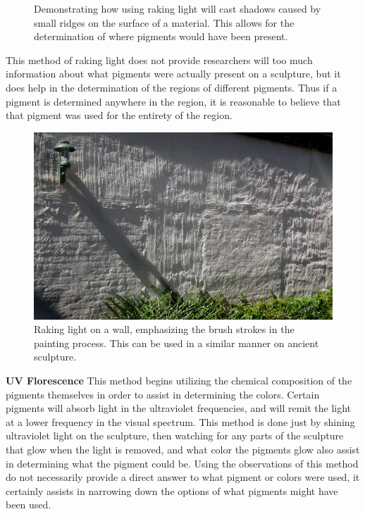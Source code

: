 \documentclass[10pt]{armath}
\begin{document}
\begin{figure}[htpb]
  \begin{center}
  \end{center}
  \caption{Demonstrating how using raking light will cast shadows caused by small
    ridges on the surface of a material. This allows for the determination of where
  pigments would have been present.}
  \label{fig:raking_light_2}
\end{figure}

This method of raking light does not provide researchers will too much
information about what pigments were actually present on a sculpture, but it
does help in the determination of the regions of different pigments. Thus if a
pigment is determined anywhere in the region, it is reasonable to  believe
that that pigment was used for the entirety of the region.

\begin{figure}[htpb]
  \centering
  \includegraphics[width=0.5\linewidth]{raking_light.jpg}
  \caption{Raking light on a wall, emphasizing the brush strokes in the
  painting process. This can be used in a similar manner on ancient sculpture.}
  \label{fig:raking_light}
\end{figure}

\textbf{UV Florescence} This method begins utilizing the chemical composition
of the pigments themselves in order to assist in determining the colors.
Certain pigments will absorb light in the ultraviolet frequencies, and will
remit the light at a lower frequency in the visual spectrum. This method is
done just by shining ultraviolet light on the sculpture, then watching for any
parts of the sculpture that glow when the light is removed, and what color the
pigments glow also assist in determining what the pigment could be. Using the
observations of this method do not necessarily provide a direct answer to what
pigment or colors were used, it certainly assists in narrowing down the
options of what pigments might have been used.
\end{document}
